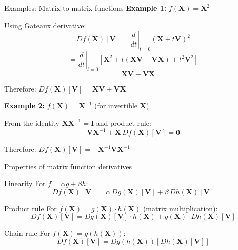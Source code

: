 \documentclass[aspectratio=1610]{beamer}
\begin{document}
\begin{frame}{Examples: Matrix to matrix functions}
  \textbf{Example 1:} $f(\mathbf{X}) = \mathbf{X}^2$
  
  Using Gateaux derivative:
  $$Df(\mathbf{X})[\mathbf{V}] = \left.\frac{d}{dt}\right|_{t=0} (\mathbf{X}+t\mathbf{V})^2$$
  $$= \left.\frac{d}{dt}\right|_{t=0} [\mathbf{X}^2 + t(\mathbf{X}\mathbf{V} + \mathbf{V}\mathbf{X}) + t^2\mathbf{V}^2]$$
  $$= \mathbf{X}\mathbf{V} + \mathbf{V}\mathbf{X}$$
  
  Therefore: $\boxed{Df(\mathbf{X})[\mathbf{V}] = \mathbf{X}\mathbf{V} + \mathbf{V}\mathbf{X}}$
  
  \vspace{10pt}
  
  \textbf{Example 2:} $f(\mathbf{X}) = \mathbf{X}^{-1}$ (for invertible $\mathbf{X}$)
  
  From the identity $\mathbf{X}\mathbf{X}^{-1} = \mathbf{I}$ and product rule:
  $$\mathbf{V}\mathbf{X}^{-1} + \mathbf{X} \, Df(\mathbf{X})[\mathbf{V}] = \mathbf{0}$$
  
  Therefore: $\boxed{Df(\mathbf{X})[\mathbf{V}] = -\mathbf{X}^{-1}\mathbf{V}\mathbf{X}^{-1}}$
\end{frame}

\begin{frame}{Properties of matrix function derivatives}
  \begin{block}{Linearity}
    For $f = \alpha g + \beta h$:
    $$Df(\mathbf{X})[\mathbf{V}] = \alpha \, Dg(\mathbf{X})[\mathbf{V}] + \beta \, Dh(\mathbf{X})[\mathbf{V}]$$
  \end{block}
  
  \begin{block}{Product rule}
    For $f(\mathbf{X}) = g(\mathbf{X}) \cdot h(\mathbf{X})$ (matrix multiplication):
    $$Df(\mathbf{X})[\mathbf{V}] = Dg(\mathbf{X})[\mathbf{V}] \cdot h(\mathbf{X}) + g(\mathbf{X}) \cdot Dh(\mathbf{X})[\mathbf{V}]$$
  \end{block}
  
  \begin{block}{Chain rule}
    For $f(\mathbf{X}) = g(h(\mathbf{X}))$:
    $$Df(\mathbf{X})[\mathbf{V}] = Dg(h(\mathbf{X}))[Dh(\mathbf{X})[\mathbf{V}]]$$
  \end{block}
\end{frame}
\end{document}

